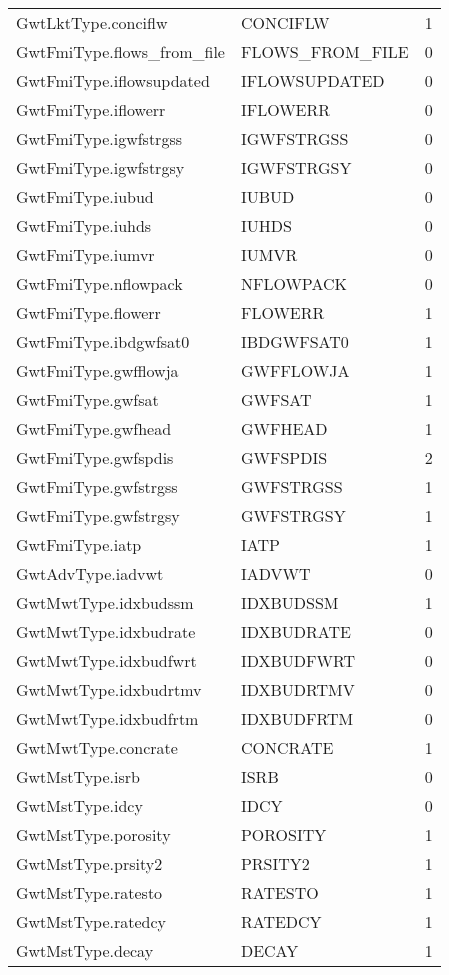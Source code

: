 \begin{longtable}{p{6cm} p{4cm} p{2cm} }
GwtLktType.conciflw &  CONCIFLW & 1 \\ 
GwtFmiType.flows\_from\_file &  FLOWS\_FROM\_FILE & 0 \\ 
GwtFmiType.iflowsupdated &  IFLOWSUPDATED & 0 \\ 
GwtFmiType.iflowerr &  IFLOWERR & 0 \\ 
GwtFmiType.igwfstrgss &  IGWFSTRGSS & 0 \\ 
GwtFmiType.igwfstrgsy &  IGWFSTRGSY & 0 \\ 
GwtFmiType.iubud &  IUBUD & 0 \\ 
GwtFmiType.iuhds &  IUHDS & 0 \\ 
GwtFmiType.iumvr &  IUMVR & 0 \\ 
GwtFmiType.nflowpack &  NFLOWPACK & 0 \\ 
GwtFmiType.flowerr &  FLOWERR & 1 \\ 
GwtFmiType.ibdgwfsat0 &  IBDGWFSAT0 & 1 \\ 
GwtFmiType.gwfflowja &  GWFFLOWJA & 1 \\ 
GwtFmiType.gwfsat &  GWFSAT & 1 \\ 
GwtFmiType.gwfhead &  GWFHEAD & 1 \\ 
GwtFmiType.gwfspdis &  GWFSPDIS & 2 \\ 
GwtFmiType.gwfstrgss &  GWFSTRGSS & 1 \\ 
GwtFmiType.gwfstrgsy &  GWFSTRGSY & 1 \\ 
GwtFmiType.iatp &  IATP & 1 \\ 
GwtAdvType.iadvwt &  IADVWT & 0 \\ 
GwtMwtType.idxbudssm &  IDXBUDSSM & 1 \\ 
GwtMwtType.idxbudrate &  IDXBUDRATE & 0 \\ 
GwtMwtType.idxbudfwrt &  IDXBUDFWRT & 0 \\ 
GwtMwtType.idxbudrtmv &  IDXBUDRTMV & 0 \\ 
GwtMwtType.idxbudfrtm &  IDXBUDFRTM & 0 \\ 
GwtMwtType.concrate &  CONCRATE & 1 \\ 
GwtMstType.isrb &  ISRB & 0 \\ 
GwtMstType.idcy &  IDCY & 0 \\ 
GwtMstType.porosity &  POROSITY & 1 \\ 
GwtMstType.prsity2 &  PRSITY2 & 1 \\ 
GwtMstType.ratesto &  RATESTO & 1 \\ 
GwtMstType.ratedcy &  RATEDCY & 1 \\ 
GwtMstType.decay &  DECAY & 1 \\ 

\end{longtable}
